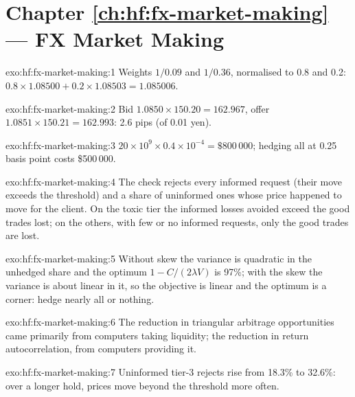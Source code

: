 \section*{Chapter \ref{ch:hf:fx-market-making} --- FX Market Making}

\begin{solution}{exo:hf:fx-market-making:1}
Weights $1/0.09$ and $1/0.36$, normalised to 0.8 and 0.2: $0.8\times1.08500+0.2\times1.08503=1.085006$.
\end{solution}

\begin{solution}{exo:hf:fx-market-making:2}
Bid $1.0850\times150.20=162.967$, offer $1.0851\times150.21=162.993$: 2.6 pips (of 0.01 yen).
\end{solution}

\begin{solution}{exo:hf:fx-market-making:3}
$20\times10^9\times0.4\times10^{-4}=\$800\,000$; hedging all at 0.25 basis point costs \$500\,000.
\end{solution}

\begin{solution}{exo:hf:fx-market-making:4}
The check rejects every informed request (their move exceeds the threshold) and a share of uninformed ones whose price happened to move for the
client. On the toxic tier the informed losses avoided exceed the good trades lost; on the others, with few or no informed requests, only the good
trades are lost.
\end{solution}

\begin{solution}{exo:hf:fx-market-making:5}
Without skew the variance is quadratic in the unhedged share and the optimum $1-C/(2\lambda V)$ is 97\%; with the skew the variance is about linear
in it, so the objective is linear and the optimum is a corner: hedge nearly all or nothing.
\end{solution}

\begin{solution}{exo:hf:fx-market-making:6}
The reduction in triangular arbitrage opportunities came primarily from computers taking liquidity; the reduction in return autocorrelation, from
computers providing it.
\end{solution}

\begin{solution}{exo:hf:fx-market-making:7}
Uninformed tier-3 rejects rise from 18.3\% to 32.6\%: over a longer hold, prices move beyond the threshold more often.
\end{solution}

